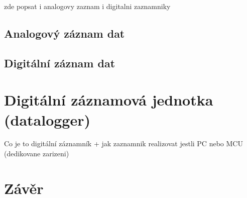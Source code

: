 zde popsat i analogovy zaznam i digitalni zaznamniky
\subsection{Analogový záznam dat}
\label{moznosti_zaznamu_dat}

\subsection{Digitální záznam dat}
\label{moznosti_zaznamu_dat}


\section{Digitální záznamová jednotka (datalogger)}
\label{digitalni_zaznamnik}
Co je to digitální záznamník
+ jak zaznamnik realizovat jestli PC nebo MCU (dedikovane zarizeni)

\section{Závěr}
\label{zaverPrace}




%
